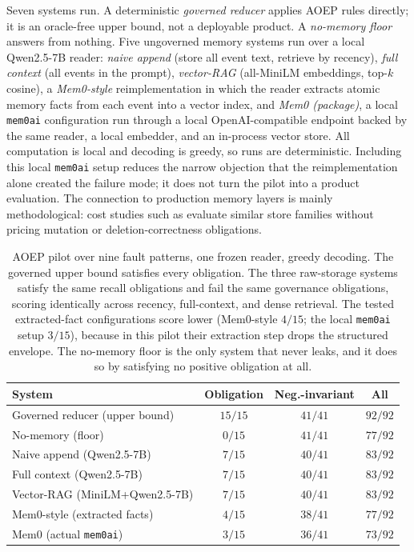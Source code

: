 Seven systems run. A deterministic \emph{governed reducer} applies AOEP rules directly; it is an oracle-free upper bound, not a deployable product. A \emph{no-memory floor} answers from nothing. Five ungoverned memory systems run over a local Qwen2.5-7B reader: \emph{naive append} (store all event text, retrieve by recency), \emph{full context} (all events in the prompt), \emph{vector-RAG} (all-MiniLM embeddings, top-$k$ cosine), a \emph{Mem0-style} reimplementation in which the reader extracts atomic memory facts from each event into a vector index, and \emph{Mem0 (package)}, a local \texttt{mem0ai} configuration run through a local OpenAI-compatible endpoint backed by the same reader, a local embedder, and an in-process vector store. All computation is local and decoding is greedy, so runs are deterministic. Including this local \texttt{mem0ai} setup reduces the narrow objection that the reimplementation alone created the failure mode; it does not turn the pilot into a product evaluation. The connection to production memory layers is mainly methodological: cost studies such as \citet{wolff2026costaccuracy} evaluate similar store families without pricing mutation or deletion-correctness obligations.

\begin{table}[t]
\centering
\small
\begin{tabular}{lccc}
\toprule
System & Obligation & Neg.-invariant & All \\
\midrule
Governed reducer (upper bound) & $15/15$ & $41/41$ & $92/92$ \\
No-memory (floor) & $0/15$ & $41/41$ & $77/92$ \\
Naive append (Qwen2.5-7B) & $7/15$ & $40/41$ & $83/92$ \\
Full context (Qwen2.5-7B) & $7/15$ & $40/41$ & $83/92$ \\
Vector-RAG (MiniLM+Qwen2.5-7B) & $7/15$ & $40/41$ & $83/92$ \\
Mem0-style (extracted facts) & $4/15$ & $38/41$ & $77/92$ \\
Mem0 (actual \texttt{mem0ai}) & $3/15$ & $36/41$ & $73/92$ \\
\bottomrule
\end{tabular}
\caption{AOEP pilot over nine fault patterns, one frozen reader, greedy decoding. The governed upper bound satisfies every obligation. The three raw-storage systems satisfy the same recall obligations and fail the same governance obligations, scoring identically across recency, full-context, and dense retrieval. The tested extracted-fact configurations score lower (Mem0-style $4/15$; the local \texttt{mem0ai} setup $3/15$), because in this pilot their extraction step drops the structured envelope. The no-memory floor is the only system that never leaks, and it does so by satisfying no positive obligation at all.}
\label{tab:aoep-pilot}
\end{table}

